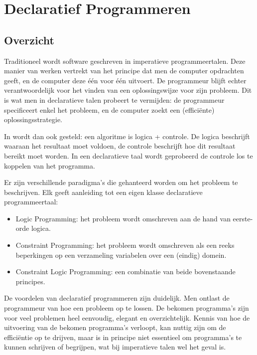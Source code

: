 
\chapter{Declaratief Programmeren} \label{chap:decl}

\section{Overzicht} \label{sec:decl-overz}

Traditioneel wordt software geschreven in imperatieve programmeertalen. Deze manier van werken vertrekt van het principe dat men de computer opdrachten geeft, en de computer deze \'e\'en voor \'e\'en uitvoert. De programmeur blijft echter verantwoordelijk voor het vinden van een oplossingswijze voor zijn probleem. Dit is wat men in declaratieve talen probeert te vermijden: de programmeur specificeert enkel het probleem, en de computer zoekt een (effici\"ente) oplossingsstrategie.

In \cite{kowalski} wordt dan ook gesteld: een algoritme is logica + controle. De logica beschrijft waaraan het resultaat moet voldoen, de controle beschrijft hoe dit resultaat bereikt moet worden. In een declaratieve taal wordt geprobeerd de controle los te koppelen van het programma.

Er zijn verschillende paradigma's die gehanteerd worden om het probleem te beschrijven. Elk geeft aanleiding tot een eigen klasse declaratieve programmeertaal: \begin{itemize}
\item Logic Programming: het probleem wordt omschreven aan de hand van eerste-orde logica.
\item Constraint Programming: het probleem wordt omschreven als een reeks beperkingen op een verzameling variabelen over een (eindig) domein.
\item Constraint Logic Programming: een combinatie van beide bovenstaande principes.
\end{itemize}

De voordelen van declaratief programmeren zijn duidelijk. Men ontlast de programmeur van hoe een probleem op te lossen. De bekomen programma's zijn voor veel problemen heel eenvoudig, elegant en overzichtelijk. Kennis van hoe de uitvoering van de bekomen programma's verloopt, kan nuttig zijn om de effici\"entie op te drijven, maar is in principe niet essentieel om programma's te kunnen schrijven of begrijpen, wat bij imperatieve talen wel het geval is.

